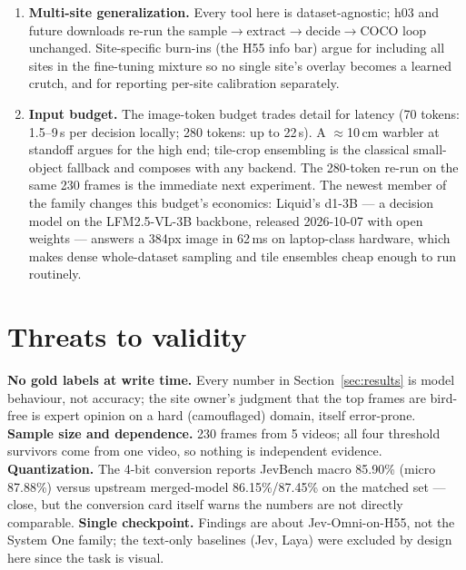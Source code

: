 \documentclass[11pt]{article}
\newcommand{\code}[1]{\texttt{#1}}
\newcommand{\sone}{System One}
\begin{document}
\begin{enumerate}
        harness already supports a \code{primary\_category} choice question
        when the category list stays under 20 options; with the h23 category
        vocabulary (or a warbler-centric reduction:
        \code{hume's leaf warbler} / \code{other bird} / \code{none}), the
        same typed interface extends from ``is a bird present'' to ``is this
        the warbler,'' and gold presence labels plus site records can
        supervise it. The head's positional option slicing
        (Section~\ref{sec:architecture}) makes canonical option order part of
        the training contract.
  \item \textbf{Multi-site generalization.} Every tool here is
        dataset-agnostic; h03 and future downloads re-run the
        sample$\to$extract$\to$decide$\to$COCO loop unchanged. Site-specific
        burn-ins (the H55 info bar) argue for including all sites in the
        fine-tuning mixture so no single site's overlay becomes a learned
        crutch, and for reporting per-site calibration separately.
  \item \textbf{Input budget.} The image-token budget trades detail for
        latency (70 tokens: 1.5--9\,s per decision locally; 280 tokens: up to
        22\,s). A $\approx$10\,cm warbler at standoff argues for the high end;
        tile-crop ensembling is the classical small-object fallback and
        composes with any backend. The 280-token re-run on the same 230
        frames is the immediate next experiment. The newest member of the
        family changes this budget's economics: Liquid's d1-3B
        \cite{liquid2026d1} --- a decision model on the LFM2.5-VL-3B backbone,
        released 2026-10-07 with open weights --- answers a 384px image in
        62\,ms on laptop-class hardware, which makes dense whole-dataset
        sampling and tile ensembles cheap enough to run routinely.
\end{enumerate}

\section{Threats to validity}

\textbf{No gold labels at write time.} Every number in Section~\ref{sec:results}
is model behaviour, not accuracy; the site owner's judgment that the top
frames are bird-free is expert opinion on a hard (camouflaged) domain, itself
error-prone. \textbf{Sample size and dependence.} 230 frames from 5 videos;
all four threshold survivors come from one video, so nothing is independent
evidence. \textbf{Quantization.} The 4-bit conversion reports JevBench macro
85.90\% (micro 87.88\%) versus upstream merged-model 86.15\%/87.45\% on the
matched set --- close, but the conversion card itself warns the numbers are
not directly comparable. \textbf{Single checkpoint.} Findings are about
Jev-Omni-on-H55, not the \sone{} family; the text-only baselines (Jev, Laya)
were excluded by design here since the task is visual.
\end{document}
